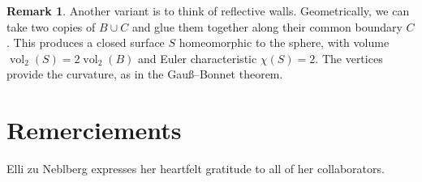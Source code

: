 \documentclass[a4paper]{amsart}
\numberwithin{equation}{section}
\theoremstyle{plain}
\theoremstyle{definition}
\newtheorem{remark}[theorem]{Remark}
\DeclareMathOperator{\vol}{vol}
\begin{document}
\begin{remark}
  Another variant is to think of reflective walls.
  Geometrically, we can take two copies of $B \cup C$
  and glue them together along their common boundary $C$.
  This produces a closed surface $S$ homeomorphic to the sphere,
  with volume $\vol_2(S) = 2 \vol_2(B)$ and Euler characteristic $\chi(S) = 2$.
  The vertices provide the curvature, as in the Gauß--Bonnet theorem.
\end{remark}




\section*{Remerciements}

Elli zu Neblberg expresses her heartfelt gratitude to all of her collaborators.


\end{document}
